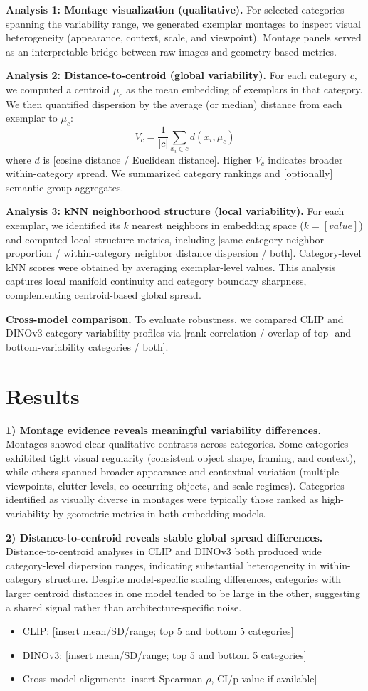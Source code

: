 \documentclass[11pt]{article}
\begin{document}
\textbf{Analysis 1: Montage visualization (qualitative).}
For selected categories spanning the variability range, we generated exemplar montages to inspect visual heterogeneity (appearance, context, scale, and viewpoint). Montage panels served as an interpretable bridge between raw images and geometry-based metrics.

\textbf{Analysis 2: Distance-to-centroid (global variability).}
For each category $c$, we computed a centroid $\mu_c$ as the mean embedding of exemplars in that category. We then quantified dispersion by the average (or median) distance from each exemplar to $\mu_c$:
\[
V_c = \frac{1}{|c|}\sum_{x_i \in c} d(x_i, \mu_c)
\]
where $d$ is [cosine distance / Euclidean distance]. Higher $V_c$ indicates broader within-category spread. We summarized category rankings and [optionally] semantic-group aggregates.

\textbf{Analysis 3: kNN neighborhood structure (local variability).}
For each exemplar, we identified its $k$ nearest neighbors in embedding space ($k = [value]$) and computed local-structure metrics, including [same-category neighbor proportion / within-category neighbor distance dispersion / both]. Category-level kNN scores were obtained by averaging exemplar-level values. This analysis captures local manifold continuity and category boundary sharpness, complementing centroid-based global spread.

\textbf{Cross-model comparison.}
To evaluate robustness, we compared CLIP and DINOv3 category variability profiles via [rank correlation / overlap of top- and bottom-variability categories / both].

\section*{Results}
\textbf{1) Montage evidence reveals meaningful variability differences.}
Montages showed clear qualitative contrasts across categories. Some categories exhibited tight visual regularity (consistent object shape, framing, and context), while others spanned broader appearance and contextual variation (multiple viewpoints, clutter levels, co-occurring objects, and scale regimes). Categories identified as visually diverse in montages were typically those ranked as high-variability by geometric metrics in both embedding models.

\textbf{2) Distance-to-centroid reveals stable global spread differences.}
Distance-to-centroid analyses in CLIP and DINOv3 both produced wide category-level dispersion ranges, indicating substantial heterogeneity in within-category structure. Despite model-specific scaling differences, categories with larger centroid distances in one model tended to be large in the other, suggesting a shared signal rather than architecture-specific noise.
\begin{itemize}
  \item CLIP: [insert mean/SD/range; top 5 and bottom 5 categories]
  \item DINOv3: [insert mean/SD/range; top 5 and bottom 5 categories]
  \item Cross-model alignment: [insert Spearman $\rho$, CI/p-value if available]
\end{itemize}
\end{document}
